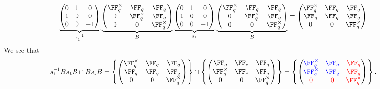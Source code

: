 \documentclass[11pt]{amsart}
\theoremstyle{remark}
\begin{document}
\[
	\underbrace{\begin{pmatrix}
			0 & 1 & 0  \\
			1 & 0 & 0  \\
			0 & 0 & -1
		\end{pmatrix}}_{s_1^{-1}}
	\underbrace{\begin{pmatrix}
			\FF_q^\times & \FF_q        & \FF_q        \\
			0            & \FF_q^\times & \FF_q        \\
			0            & 0            & \FF_q^\times
		\end{pmatrix}}_{B}
	\underbrace{\begin{pmatrix}
			0 & 1 & 0  \\
			1 & 0 & 0  \\
			0 & 0 & -1
		\end{pmatrix}}_{s_1}
	\underbrace{\begin{pmatrix}
			\FF_q^\times & \FF_q        & \FF_q        \\
			0            & \FF_q^\times & \FF_q        \\
			0            & 0            & \FF_q^\times
		\end{pmatrix}}_{B} =
	\begin{pmatrix}
		\FF_q^\times & \FF_q & \FF_q        \\
		\FF_q        & \FF_q & \FF_q        \\
		0            & 0     & \FF_q^\times
	\end{pmatrix}
\]
We see that
\[
	s_1^{-1}Bs_1B\cap Bs_1B = \left\{\begin{pmatrix}
		\FF_q^\times & \FF_q & \FF_q        \\
		\FF_q        & \FF_q & \FF_q        \\
		0            & 0     & \FF_q^\times
	\end{pmatrix}\right\}
	\cap
	\left\{\begin{pmatrix}
		\FF_q        & \FF_q & \FF_q        \\
		\FF_q^\times & \FF_q & \FF_q        \\
		0            & 0     & \FF_q^\times
	\end{pmatrix}
	\right\} =
	\left\{
	\begin{pmatrix}
		\color{blue}\FF_q^\times & \color{blue}\FF_q & \color{red}\FF_q        \\
		\color{blue}\FF_q^\times & \color{blue}\FF_q & \color{red}\FF_q        \\
		\color{red}0             & \color{red}0      & \color{red}\FF_q^\times
	\end{pmatrix}
	\right\}.
\]
\end{document}
